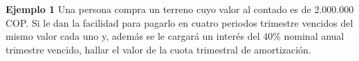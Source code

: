 
\textbf{Ejemplo 1}\newline
Una persona compra un terreno cuyo valor al contado es de 2.000.000 COP. Si le dan la facilidad para pagarlo en cuatro periodos trimestre vencidos del mismo valor cada uno y, además se le cargará un interés del 40\% nominal anual trimestre vencido, hallar el valor de la cuota trimestral de amortización.\\ \\

